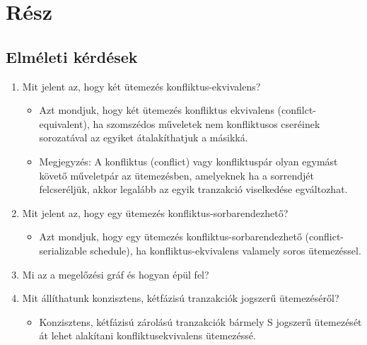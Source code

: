 \documentclass[a4paper,11.5pt, table]{article}
\begin{document}
\newpage

\section{Rész}

\subsection{Elméleti kérdések}

	\begin{enumerate}
		\item Mit jelent az, hogy két ütemezés konfliktus-ekvivalens?
		\begin{itemize}
			\item Azt mondjuk, hogy két ütemezés konfliktus ekvivalens (confilct-equivalent), ha szomszédos műveletek nem konfliktusos cseréinek sorozatával az egyiket átalakíthatjuk a másikká.
			\item Megjegyzés: A konfliktus (conflict) vagy konfliktuspár olyan egymást követő műveletpár az ütemezésben, amelyeknek ha a sorrendjét felcseréljük, akkor legalább az egyik tranzakció viselkedése egváltozhat.
		\end{itemize}
			
		\item Mit jelent az, hogy egy ütemezés konfliktus-sorbarendezhető?
			\begin{itemize}
				\item Azt mondjuk, hogy egy ütemezés konfliktus-sorbarendezhető (conflict-serializable schedule), ha konfliktus-ekvivalens valamely soros ütemezéssel. 
			\end{itemize}
				
		\item Mi az a megelőzési gráf és hogyan épül fel?
		\item Mit állíthatunk konzisztens, kétfázisú tranzakciók jogszerű ütemezéséről?
			\begin{itemize}
				\item Konzisztens, kétfázisú zárolású tranzakciók bármely S jogszerű ütemezését át lehet alakítani konfliktusekvivalens ütemezéssé.
			\end{itemize}
		

\end{enumerate}
\end{document}
